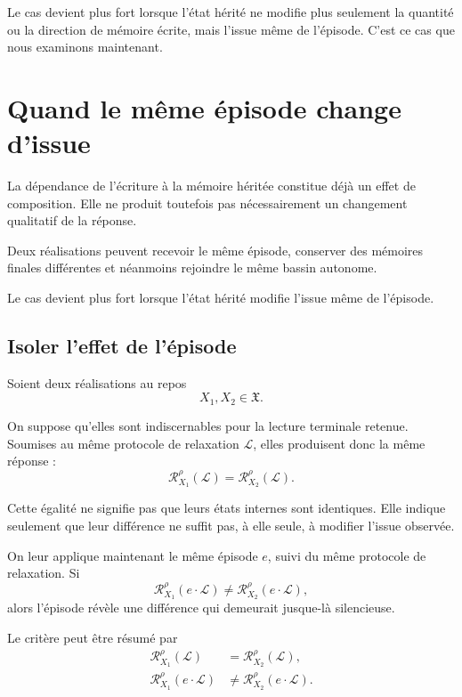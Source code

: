Le cas devient plus fort lorsque l'état hérité ne modifie plus seulement la quantité ou la direction de mémoire écrite, mais l'issue même de l'épisode. C'est ce cas que nous examinons maintenant.

\section{Quand le même épisode change d'issue}
\label{t3-meme-episode-change-issue}

La dépendance de l'écriture à la mémoire héritée constitue déjà un effet de composition. Elle ne produit toutefois pas nécessairement un changement qualitatif de la réponse.

Deux réalisations peuvent recevoir le même épisode, conserver des mémoires finales différentes et néanmoins rejoindre le même bassin autonome.

Le cas devient plus fort lorsque l'état hérité modifie l'issue même de l'épisode.

\subsection{Isoler l'effet de l'épisode}

Soient deux réalisations au repos
\[
X_1,X_2\in\mathfrak X.
\]

On suppose qu'elles sont indiscernables pour la lecture terminale retenue. Soumises au même protocole de relaxation $\mathcal L$, elles produisent donc la même réponse :
\[
\mathcal R_{X_1}^{\rho}(\mathcal L)
=
\mathcal R_{X_2}^{\rho}(\mathcal L).
\]

Cette égalité ne signifie pas que leurs états internes sont identiques. Elle indique seulement que leur différence ne suffit pas, à elle seule, à modifier l'issue observée.

On leur applique maintenant le même épisode $e$, suivi du même protocole de relaxation. Si
\[
\mathcal R_{X_1}^{\rho}(e\cdot\mathcal L)
\neq
\mathcal R_{X_2}^{\rho}(e\cdot\mathcal L),
\]
alors l'épisode révèle une différence qui demeurait jusque-là silencieuse.

Le critère peut être résumé par
\begin{equation}
\label{eq:t3-episode-change-issue}
\boxed{
\begin{aligned}
\mathcal R_{X_1}^{\rho}(\mathcal L)
&=
\mathcal R_{X_2}^{\rho}(\mathcal L),
\\
\mathcal R_{X_1}^{\rho}(e\cdot\mathcal L)
&\neq
\mathcal R_{X_2}^{\rho}(e\cdot\mathcal L).
\end{aligned}
}
\end{equation}

